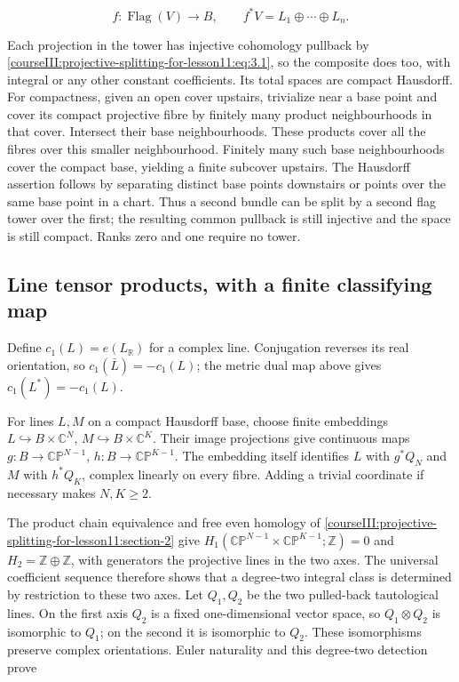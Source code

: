 \begin{equation}
f:\operatorname{Flag}(V)\longrightarrow B,\qquad f^*V=L_1\oplus\cdots\oplus L_n.
\label{courseIII:projective-splitting-for-lesson11:eq:4.1}
\end{equation}

Each projection in the tower has injective cohomology pullback by \eqref{courseIII:projective-splitting-for-lesson11:eq:3.1}, so the composite does too, with integral or any other constant coefficients. Its total spaces are compact Hausdorff. For compactness, given an open cover upstairs, trivialize near a base point and cover its compact projective fibre by finitely many product neighbourhoods in that cover. Intersect their base neighbourhoods. These products cover all the fibres over this smaller neighbourhood. Finitely many such base neighbourhoods cover the compact base, yielding a finite subcover upstairs. The Hausdorff assertion follows by separating distinct base points downstairs or points over the same base point in a chart. Thus a second bundle can be split by a second flag tower over the first; the resulting common pullback is still injective and the space is still compact. Ranks zero and one require no tower.

\subsection{Line tensor products, with a finite classifying map}
\label{courseIII:projective-splitting-for-lesson11:line-tensor-rule}

\label{courseIII:projective-splitting-for-lesson11:section-5}\label{courseIII:projective-splitting-for-lesson11:CG-S6-PROJECTIVE-5}

Define \(c_1(L)=e(L_{\mathbb R})\) for a complex line. Conjugation reverses its real orientation, so \(c_1(\bar L)=-c_1(L)\); the metric dual map above gives \(c_1(L^*)=-c_1(L)\).

For lines \(L,M\) on a compact Hausdorff base, choose finite embeddings \(L\hookrightarrow B\times\mathbb C^N\), \(M\hookrightarrow B\times\mathbb C^K\). Their image projections give continuous maps \(g:B\to\mathbb{CP}^{N-1}\), \(h:B\to\mathbb{CP}^{K-1}\). The embedding itself identifies \(L\) with \(g^*Q_N\) and \(M\) with \(h^*Q_K\), complex linearly on every fibre. Adding a trivial coordinate if necessary makes \(N,K\ge2\).

The product chain equivalence and free even homology of \cref{courseIII:projective-splitting-for-lesson11:section-2} give \(H_1(\mathbb{CP}^{N-1}\times\mathbb{CP}^{K-1};\mathbb Z)=0\) and \(H_2=\mathbb Z\oplus\mathbb Z\), with generators the projective lines in the two axes. The universal coefficient sequence therefore shows that a degree-two integral class is determined by restriction to these two axes. Let \(Q_1,Q_2\) be the two pulled-back tautological lines. On the first axis \(Q_2\) is a fixed one-dimensional vector space, so \(Q_1\otimes Q_2\) is isomorphic to \(Q_1\); on the second it is isomorphic to \(Q_2\). These isomorphisms preserve complex orientations. Euler naturality and this degree-two detection prove

